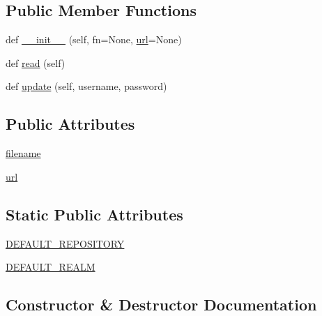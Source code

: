 \subsection*{Public Member Functions}
\begin{DoxyCompactItemize}
\item 
def \hyperlink{classpip_1_1__vendor_1_1distlib_1_1util_1_1PyPIRCFile_a3b9c0e26e2c3960f90c4e6651ba6ceaa}{\+\_\+\+\_\+init\+\_\+\+\_\+} (self, fn=None, \hyperlink{classpip_1_1__vendor_1_1distlib_1_1util_1_1PyPIRCFile_a4e3b6af9bc61da415ac66bf2bfc36a78}{url}=None)
\item 
def \hyperlink{classpip_1_1__vendor_1_1distlib_1_1util_1_1PyPIRCFile_a92e03bb67457320537819c9dff7c3112}{read} (self)
\item 
def \hyperlink{classpip_1_1__vendor_1_1distlib_1_1util_1_1PyPIRCFile_ae59567f33d08b331ee354ed75d33a4fe}{update} (self, username, password)
\end{DoxyCompactItemize}
\subsection*{Public Attributes}
\begin{DoxyCompactItemize}
\item 
\hyperlink{classpip_1_1__vendor_1_1distlib_1_1util_1_1PyPIRCFile_a53ae17071fc7d1b868e41a3158bf0862}{filename}
\item 
\hyperlink{classpip_1_1__vendor_1_1distlib_1_1util_1_1PyPIRCFile_a4e3b6af9bc61da415ac66bf2bfc36a78}{url}
\end{DoxyCompactItemize}
\subsection*{Static Public Attributes}
\begin{DoxyCompactItemize}
\item 
\hyperlink{classpip_1_1__vendor_1_1distlib_1_1util_1_1PyPIRCFile_a529007867cc6adb5d6c24b696210a55d}{D\+E\+F\+A\+U\+L\+T\+\_\+\+R\+E\+P\+O\+S\+I\+T\+O\+RY}
\item 
\hyperlink{classpip_1_1__vendor_1_1distlib_1_1util_1_1PyPIRCFile_a456beb00a6d82a3429e2000fb7a611da}{D\+E\+F\+A\+U\+L\+T\+\_\+\+R\+E\+A\+LM}
\end{DoxyCompactItemize}


\subsection{Constructor \& Destructor Documentation}
\mbox{\label{classpip_1_1__vendor_1_1distlib_1_1util_1_1PyPIRCFile_a3b9c0e26e2c3960f90c4e6651ba6ceaa}} 

